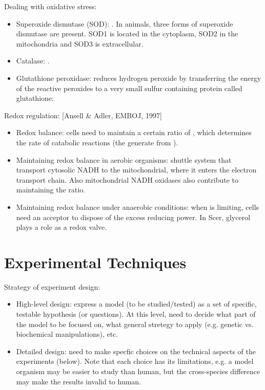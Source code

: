 \documentclass{report}
\begin{document}
\begin{enumerate}
Dealing with oxidative stress: 
\begin{itemize}
	\item Superoxide dismutase (SOD): . In animals, three forms of superoxide dismutase are present. SOD1 is located in the cytoplasm, SOD2 in the mitochondria  and SOD3 is extracellular.  
	\item Catalase: . 
	\item Glutathione peroxidase: reduces hydrogen peroxide by transferring the energy of the reactive peroxides to a very small sulfur containing protein called glutathione: 
\end{itemize}

Redox regulation: [Ansell \& Adler, EMBOJ, 1997]
\begin{itemize}
	\item Redox balance: cells need to maintain a certain ratio of , which determines the rate of catabolic reactions (the generate  from ). 
	\item Maintaining redox balance in aerobic organisms: shuttle system that transport cytosolic NADH to the mitochondrial, where it enters the electron transport chain. Also mitochondrial NADH oxidases also contribute to maintaining the ratio. 
	\item Maintaining redox balance under anaerobic conditions: when  is limiting, cells need an  acceptor to dispose of the excess reducing power. In Scer, glycerol plays a role as a redox valve. 
\end{itemize}

\end{enumerate}
\chapter{Experimental Techniques}

Strategy of experiment design: 
\begin{itemize}
	\item High-level design: express a model (to be studied/tested) as a set of specific, testable hypothesis (or questions). At this level, need to decide what part of the model to be focused on, what general stretegy to apply (e.g. genetic vs. biochemical manipulations), etc. 
	\item Detailed design: need to make specfic choices on the technical aspects of the experiments (below). Note that each choice has its limitations, e.g. a model organism may be easier to study than human, but the cross-species difference may make the results invalid to human. 
\end{itemize}
\end{document}
